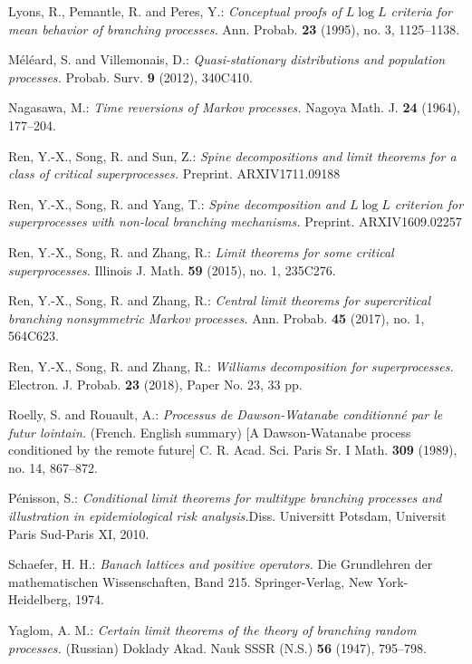 \documentclass[12pt,a4paper]{amsart}
\numberwithin{equation}{section}
\theoremstyle{plain}
\theoremstyle{definition}
\theoremstyle{remark}
\begin{document}
\begin{thebibliography}{99}
Lyons, R., Pemantle, R. and Peres, Y.:
\emph{Conceptual proofs of $L\log L$ criteria for mean behavior of branching processes.}
Ann. Probab. \textbf{23} (1995), no. 3, 1125--1138.

M\'el\'eard, S. and Villemonais, D.:
\emph{Quasi-stationary distributions and population processes.}
Probab. Surv. \textbf{9} (2012), 340C410.

Nagasawa, M.:
\emph{Time reversions of Markov processes.}
Nagoya Math. J. \textbf{24} (1964), 177--204.

Ren, Y.-X., Song, R. and Sun, Z.:
\emph{Spine decompositions and limit theorems for a class of critical superprocesses.}
Preprint.
ARXIV{1711.09188}

Ren, Y.-X., Song, R. and Yang, T.:
\emph{Spine decomposition and {$ L\log L $} criterion for superprocesses with non-local branching mechanisms.}
Preprint.
ARXIV{1609.02257}

Ren, Y.-X., Song, R. and Zhang, R.:
\emph{Limit theorems for some critical superprocesses.}
Illinois J. Math. \textbf{59} (2015), no. 1, 235C276.

Ren, Y.-X., Song, R. and Zhang, R.:
\emph{Central limit theorems for supercritical branching nonsymmetric Markov processes.}
Ann. Probab. \textbf{45} (2017), no. 1, 564C623.

Ren, Y.-X., Song, R. and Zhang, R.:
\emph{Williams decomposition for superprocesses.}
Electron. J. Probab. \textbf{23} (2018), Paper No. 23, 33 pp.

Roelly, S. and Rouault, A.:
\emph{Processus de Dawson-Watanabe conditionn\'e par le futur lointain.} (French. English summary) [A Dawson-Watanabe process conditioned by the remote future]
C. R. Acad. Sci. Paris Sr. I Math. \textbf{309} (1989), no. 14, 867--872.

P\'enisson, S.:
\emph{Conditional limit theorems for multitype branching processes and illustration in epidemiological risk analysis.}Diss. Universitt Potsdam, Universit Paris Sud-Paris XI, 2010.

Schaefer, H. H.:
\emph{Banach lattices and positive operators.}
Die Grundlehren der mathematischen Wissenschaften, Band 215. Springer-Verlag, New York-Heidelberg, 1974.

Yaglom, A. M.:
\emph{Certain limit theorems of the theory of branching random processes.} (Russian)
Doklady Akad. Nauk SSSR (N.S.) \textbf{56} (1947), 795--798.
\end{thebibliography}
\end{document}
